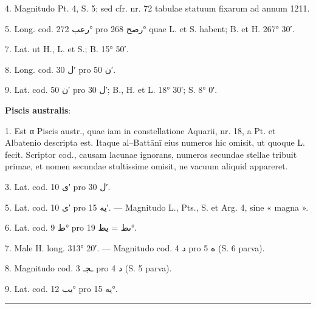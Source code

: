\documentclass[11pt]{article}
\begin{document}
{\small
\par\hangindent=12mm 4. Magnitudo Pt. 4, S. 5; sed cfr. nr. 72 tabulae statuum fixarum ad annum 1211.
\par\hangindent=12mm 5. Long. cod. \textarabic{رعب} 272° pro \textarabic{رصح} 268° quae L. et S. habent; B. et H. 267° 30′.
\par\hangindent=12mm 7. Lat. ut H., L. et S.; B. 15° 50′.
\par\hangindent=12mm 8. Long. cod. \textarabic{ل} 30′ pro \textarabic{ن} 50′.
\par\hangindent=12mm 9. Lat. cod. \textarabic{ن} 50′ pro \textarabic{ل} 30′; B., H. et L. 18° 30′; S. 8° 0′.
\par\hspace*{8mm}\textbf{Piscis australis}:
\par\hangindent=12mm 1. Est α Piscis austr., quae iam in constellatione Aquarii, nr. 18, a Pt. et Albatenio descripta est. Itaque al–Battānī eius numeros hic omisit, ut quoque L. fecit. Scriptor cod., causam lacunae ignorans, numeros secundae stellae tribuit primae, et nomen secundae stultissime omisit, ne vacuum aliquid appareret.
\par\hangindent=12mm 3. Lat. cod. \textarabic{ى} 10′ pro \textarabic{ل} 30′.
\par\hangindent=12mm 5. Lat. cod. \textarabic{ى} 10′ pro \textarabic{يه} 15′. — Magnitudo L., Pts., S. et Arg. 4, sine « magna ».
\par\hangindent=12mm 6. Lat. cod. \textarabic{ط} 9° pro \textarabic{ىط} = \textarabic{يط} 19°.
\par\hangindent=12mm 7. Male H. long. 313° 20′. — Magnitudo cod. \textarabic{د} 4 pro \textarabic{ه} 5 (S. 6 parva).
\par\hangindent=12mm 8. Magnitudo cod. \textarabic{ـجـ} 3 pro \textarabic{د} 4 (S. 5 parva).
\par\hangindent=12mm 9. Lat. cod. \textarabic{يب} 12° pro \textarabic{يه} 15°.
\par}
\clearpage
\noindent{}\par\vspace{-1mm}\noindent\rule{\textwidth}{.4pt}\par\vspace{2mm}
\end{document}
